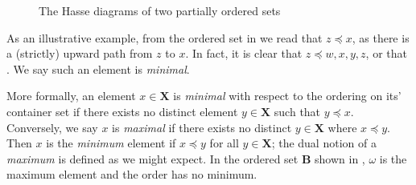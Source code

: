 \begin{figure}[H]
	\centering
	\small
	\begin{subfigure}
		{0.3\textwidth}
		\centering
		 \label{subfigure:partial-order-a}
	\end{subfigure}%
	\begin{subfigure}
		{0.3\textwidth}
		\centering
		 \label{subfigure:partial-order-b}
	\end{subfigure}%
	\caption{The Hasse diagrams of two partially ordered sets}
	\label{figure:hasse-diagram}
\end{figure}

As an illustrative example, from the ordered set in  we read that $z \preceq x$, as there
is a (strictly) upward path from $z$ to $x$. In fact, it is clear that $z \preceq w, x,y,z$, or that .
We say such an element is \textit{minimal}.

More formally, an element $x \in \mathbf{X}$ is \textit{minimal} with respect to the ordering on its' container set if
there exists no distinct element $y \in \mathbf{X}$ such that $y \preceq x$. Conversely, we say $x$ is \textit{maximal} if
there exists no distinct $y \in \mathbf{X}$ where $x \preceq y$. Then $x$ is the \textit{minimum} element if $x \preceq y$
for all $y \in \mathbf{X}$; the dual notion of a \textit{maximum} is defined as we might expect. In the ordered set
$\mathbf{B}$ shown in , $\omega$ is the maximum element and the order has no minimum.
   


